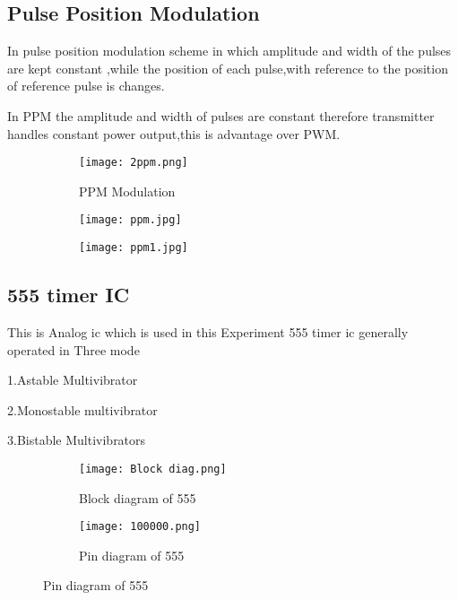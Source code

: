 \documentclass{article}
\begin{document}
\subsection{Pulse Position Modulation}
In pulse position modulation scheme in which amplitude and width of the pulses are kept constant ,while the position of each pulse,with reference to the position of reference pulse is changes.\par
In PPM the amplitude and width of pulses are constant therefore transmitter handles constant power output,this is advantage over PWM.




\begin{figure}[h]
  \begin{subfigure}[b]{0.5\textwidth}
    \texttt{[image: 2ppm.png]}
    \caption{PPM Modulation}
    \label{fig:1}
  \end{subfigure}
  \begin{subfigure}[b]{0.4\textwidth}
    \texttt{[image: ppm.jpg]}
    \caption{}
    \label{fig:2}
  \end{subfigure}
  \begin{subfigure}[b]{0.4\textwidth}
    \texttt{[image: ppm1.jpg]}
    \caption{}
    \label{fig:2}
  \end{subfigure}
\end{figure}

\subsection{555 timer IC}
This is Analog ic which is used in this Experiment 
555 timer ic generally operated in Three mode\par
1.Astable Multivibrator\par
2.Monostable multivibrator\par
3.Bistable Multivibrators\par



\begin{figure}[h]
  \begin{subfigure}[b]{0.45\textwidth}
    \texttt{[image: Block diag.png]}
    \caption{Block diagram of 555}
    \label{fig:1}
  \end{subfigure}
  \begin{subfigure}[b]{0.45\textwidth}
    \texttt{[image: 100000.png]}
    \caption{Pin diagram of 555}
    \label{fig:2}
  \end{subfigure}
\end{figure}
\end{document}
